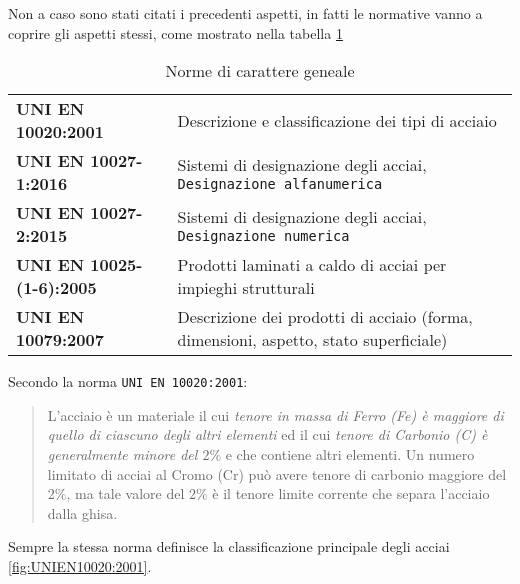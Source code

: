 Non a caso sono stati citati i precedenti aspetti, in fatti le normative vanno a coprire gli aspetti stessi, come mostrato nella tabella \ref{tab:NormGen}

\begin{table}
\centering
\caption{Norme di carattere geneale}\label{tab:NormGen}
\begin{tabularx}{\textwidth}{>{\bfseries}lX}
\toprule
UNI EN 10020:2001 & Descrizione e classificazione dei tipi di acciaio\\
UNI EN 10027-1:2016 & Sistemi di designazione degli acciai, \texttt{Designazione alfanumerica}\\
UNI EN 10027-2:2015 & Sistemi di designazione degli acciai, \texttt{Designazione numerica}\\
UNI EN 10025-(1-6):2005 & Prodotti laminati a caldo di acciai per impieghi strutturali\\
UNI EN 10079:2007 & Descrizione dei prodotti di acciaio (forma, dimensioni, aspetto, stato superficiale)\\
\bottomrule
\end{tabularx}
\end{table}

Secondo la norma \texttt{UNI EN 10020:2001}:
\begin{quote}
L'acciaio è un materiale il cui \emph{tenore in massa di Ferro (Fe) è maggiore di quello di ciascuno degli altri elementi} ed il cui \emph{tenore di Carbonio (C) è generalmente minore del $2\%$} e che contiene altri elementi. Un numero limitato di acciai al Cromo (Cr) può avere tenore di carbonio maggiore del $2\%$, ma tale valore del $2\%$ è il tenore limite corrente che separa l'acciaio dalla ghisa.
\end{quote}
Sempre la stessa norma definisce la classificazione principale degli acciai \ref{fig:UNIEN10020:2001}.

